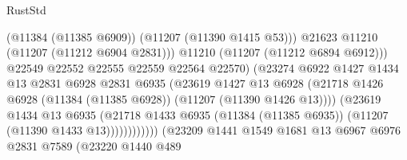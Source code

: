 \begin{lexlean}{RustStd}
\begin{coremodule}
                                                (@11384 (@11385 @6909))
                                                (@11207 (@11390 @1415 @53)))
                                              @21623
                                              @11210
                                              (@11207 (@11212 @6904 @2831)))
                                            @11210
                                            (@11207 (@11212 @6894 @6912)))
                                          @22549
                                          @22552
                                          @22555
                                          @22559
                                          @22564
                                          @22570)
                                        (@23274
                                          @6922
                                          @1427
                                          @1434
                                          @13
                                          @2831
                                          @6928
                                          @2831
                                          @6935
                                          (@23619
                                            @1427
                                            @13
                                            @6928
                                            (@21718
                                              @1426
                                              @6928
                                              (@11384 (@11385 @6928))
                                              (@11207 (@11390 @1426 @13))))
                                          (@23619
                                            @1434
                                            @13
                                            @6935
                                            (@21718
                                              @1433
                                              @6935
                                              (@11384 (@11385 @6935))
                                              (@11207 (@11390 @1433 @13))))))))))))
                          (@23209
                            @1441
                            @1549
                            @1681
                            @13
                            @6967
                            @6976
                            @2831
                            @7589
                            (@23220
                              @1440
                              @489

\end{coremodule}
\end{lexlean}
